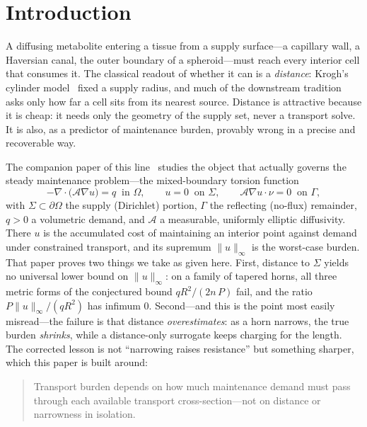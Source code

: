 \documentclass[11pt]{article}
\theoremstyle{remark}
\newcommand{\Om}{\Omega}
\newcommand{\Sig}{\Sigma}
\newcommand{\Gam}{\Gamma}
\newcommand{\norminf}[1]{\lVert#1\rVert_{\infty}}
\begin{document}
\tableofcontents

\section{Introduction}\label{sec:intro}

A diffusing metabolite entering a tissue from a supply surface---a capillary
wall, a Haversian canal, the outer boundary of a spheroid---must reach every
interior cell that consumes it. The classical readout of whether it can is a
\emph{distance}: Krogh's cylinder model~\cite{krogh1919} fixed a supply radius,
and much of the downstream tradition asks only how far a cell sits from its
nearest source. Distance is attractive because it is cheap: it needs only the
geometry of the supply set, never a transport solve. It is also, as a predictor
of maintenance burden, provably wrong in a precise and recoverable way.

The companion paper of this line~\cite{torsion} studies the object that actually
governs the steady maintenance problem---the mixed-boundary torsion function
\begin{equation}\label{eq:pde}
-\nabla\!\cdot\!\bigl(\mathcal{A}\nabla u\bigr)=q\ \text{ in }\Om,\qquad
u=0\ \text{ on }\Sig,\qquad \mathcal{A}\nabla u\cdot\nu=0\ \text{ on }\Gam,
\end{equation}
with $\Sig\subset\partial\Om$ the supply (Dirichlet) portion, $\Gam$ the
reflecting (no-flux) remainder, $q>0$ a volumetric demand, and $\mathcal{A}$ a
measurable, uniformly elliptic diffusivity. There $u$ is the accumulated cost of
maintaining an interior point against demand under constrained transport, and its
supremum $\norminf{u}$ is the worst-case burden. That paper proves two things we
take as given here. First, distance to $\Sig$ yields no universal lower bound on
$\norminf{u}$: on a family of tapered horns, all three metric forms of the
conjectured bound $qR^2/(2n\,P)$ fail, and the ratio
$P\norminf{u}/(qR^2)$ has infimum $0$. Second---and this is the point most easily
misread---the failure is that distance \emph{overestimates}: as a horn narrows,
the true burden \emph{shrinks}, while a distance-only surrogate keeps charging for
the length. The corrected lesson is not ``narrowing raises resistance'' but
something sharper, which this paper is built around:
\begin{quote}
Transport burden depends on how much maintenance demand must pass through each
available transport cross-section---not on distance or narrowness in isolation.
\end{quote}
\end{document}
